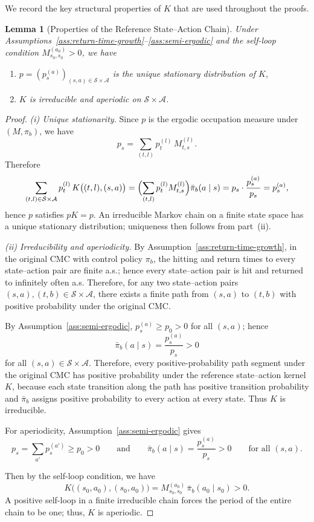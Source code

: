 \documentclass{article}
\numberwithin{equation}{section}
\newtheorem{lemma}{Lemma}
\begin{document}
We record the key structural properties of $K$ that are used throughout the proofs.

\begin{lemma}[Properties of the Reference State--Action Chain]
\label{lem:ref-chain}
Under Assumptions~\ref{ass:return-time-growth}--\ref{ass:semi-ergodic} and the self-loop condition $M_{s_0,s_0}^{(a_0)}>0$, we have
\begin{enumerate}
  \item[(i)] $p=(p_s^{(a)})_{(s,a) \in \mathcal S \times \mathcal A}$ is the unique stationary distribution of $K$,
  \item[(ii)] $K$ is irreducible and aperiodic on $\mathcal{S}\times\mathcal{A}$.
\end{enumerate}
\end{lemma}

\begin{proof}
\textit{(i) Unique stationarity.}
Since $p$ is the ergodic occupation measure under $(M,\pi_b)$, we have
\[
p_s = \sum_{(t,l)} p_t^{(l)}\,M_{t,s}^{(l)}.
\]
Therefore
\[
\sum_{(t,l)\in\mathcal{S}\times\mathcal{A}} p_t^{(l)}\,K\bigl((t,l),(s,a)\bigr)
= \Bigl(\sum_{(t,l)} p_t^{(l)} M_{t,s}^{(l)}\Bigr)\bar\pi_b(a\mid s)
= p_s\cdot\frac{p_s^{(a)}}{p_s} = p_s^{(a)},
\]
hence $p$ satisfies $pK=p$. An irreducible Markov chain on a finite state space has a unique stationary distribution; uniqueness then follows from part~(ii).

\textit{(ii) Irreducibility and aperiodicity.}
By Assumption~\ref{ass:return-time-growth}, in the original CMC with
control policy \(\pi_b\), the hitting and return times to every
state--action pair are finite a.s.; hence every state--action pair is hit
and returned to infinitely often a.s. Therefore, for any two
state--action pairs \((s,a),(t,b)\in\mathcal S\times\mathcal A\), there exists a
finite path from \((s,a)\) to \((t,b)\) with positive probability under the
original CMC.

By Assumption~\ref{ass:semi-ergodic}, \(p_s^{(a)}\ge p_0>0\) for all
\((s,a)\); hence
\[
\bar \pi_b(a\mid s)=\frac{p_s^{(a)}}{p_s}>0
\]
for all \((s,a)\in\mathcal S\times\mathcal A\). Therefore, every
positive-probability path segment under the original CMC has positive
probability under the reference state--action kernel \(K\), because each
state transition along the path has positive transition probability and
\(\bar\pi_b\) assigns positive probability to every action at every state.
Thus \(K\) is irreducible.

For aperiodicity, Assumption~\ref{ass:semi-ergodic} gives
\[
p_s = \sum_{a'} p_s^{(a')} \ge p_0 > 0
\qquad\text{and}\qquad
\bar\pi_b(a\mid s) = \frac{p_s^{(a)}}{p_s} > 0
\qquad\text{for all }(s,a).
\]

Then by the self-loop condition, we have
\[
K\bigl((s_0,a_0),(s_0,a_0)\bigr) = M_{s_0,s_0}^{(a_0)}\,\bar\pi_b(a_0\mid s_0) > 0.
\]
A positive self-loop in a finite irreducible chain forces the period of the entire chain to be one; thus, $K$ is aperiodic.
\end{proof}
\end{document}
